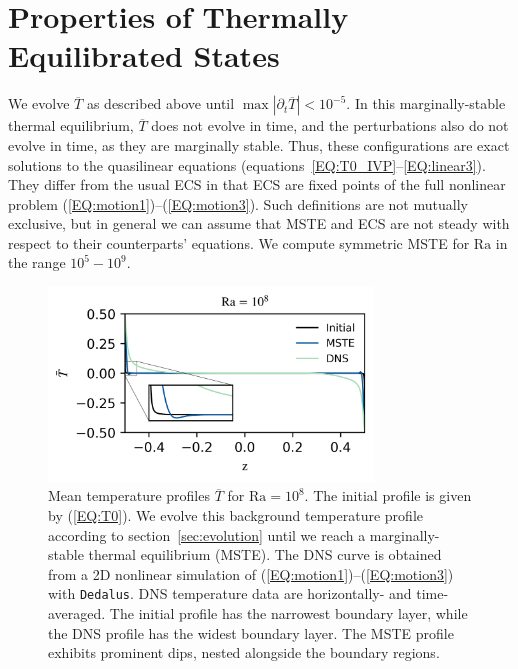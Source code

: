 \documentclass[reprint,amsmath,amssymb,aps,nofootinbib]{revtex4-1}
\newcommand\Ra{\mathrm{Ra}}
\newcommand{\eq}[1]{(\ref{#1})}
\newcommand{\eqss}[2]{(\ref{#1})--(\ref{#2})}
\begin{document}
\section{Properties of Thermally Equilibrated States}\label{sec:properties}
We evolve $\overline{T}$ as described above until $\max|\partial_{t}\overline{T}| < 10^{-5}$.
In this marginally-stable thermal equilibrium, $\overline{T}$ does not evolve in time, and the perturbations also do not evolve in time, as they are marginally stable.
Thus, these configurations are exact solutions to the quasilinear equations (equations~\ref{EQ:T0_IVP}--\ref{EQ:linear3}).
They differ from the usual ECS in that ECS are fixed points of the full nonlinear problem \eqss{EQ:motion1}{EQ:motion3}. 
Such definitions are not mutually exclusive, but in general we can assume that MSTE and ECS are not steady with respect to their counterparts' equations.
We compute symmetric MSTE for $\Ra$ in the range $10^5 - 10^9$.

\begin{figure}
    \centering
    \includegraphics[width=3.4in]{T_profs_na.png}
    \caption{Mean temperature profiles $\overline{T}$ for $\Ra = 10^8$. 
    The initial profile is given by \eq{EQ:T0}. 
    We evolve this background temperature profile according to section~\ref{sec:evolution} until we reach a marginally-stable thermal equilibrium (MSTE).
    The DNS curve is obtained from a 2D nonlinear simulation of \eqss{EQ:motion1}{EQ:motion3} with \texttt{Dedalus}.
    DNS temperature data are horizontally- and time-averaged.
    The initial profile has the narrowest boundary layer, while the DNS profile has the widest boundary layer.
    The MSTE profile exhibits prominent dips, nested alongside the boundary regions. }
    \label{fig:T0_profiles}
\end{figure}
\end{document}
